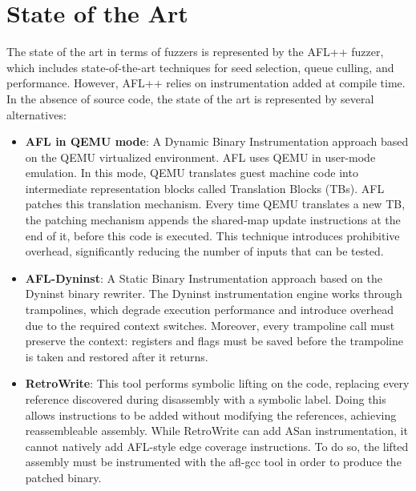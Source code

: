 \documentclass{report}
\begin{document}
            \section{State of the Art}
                The state of the art in terms of fuzzers is represented by the AFL++ fuzzer, which includes
                    state-of-the-art techniques for seed selection, queue culling, and performance.
                However, AFL++ relies on instrumentation added at compile time. In the absence of source code,
                    the state of the art is represented by several alternatives:
                \begin{itemize}
                    \item \textbf{AFL in QEMU mode}: A Dynamic Binary Instrumentation approach based on the QEMU virtualized environment.
                            AFL uses QEMU in user-mode emulation. In this mode, QEMU translates guest machine code into
                            intermediate representation blocks called Translation Blocks (TBs). AFL patches this translation mechanism.
                            Every time QEMU translates a new TB, the patching mechanism appends the shared-map update instructions
                            at the end of it, before this code is executed.
                            This technique introduces prohibitive overhead, significantly reducing the number of inputs that
                            can be tested. 
                    \item \textbf{AFL-Dyninst}: A Static Binary Instrumentation approach based on the Dyninst binary rewriter.
                            The Dyninst instrumentation engine works through trampolines, which degrade execution performance and introduce overhead
                            due to the required context switches.
                            Moreover, every trampoline call must preserve the context: registers and flags must be saved before the trampoline
                            is taken and restored after it returns.
                    \item \textbf{RetroWrite}: This tool performs symbolic lifting on the code, replacing every reference
                        discovered during disassembly with a symbolic label. Doing this allows instructions to be added without
                        modifying the references, achieving reassembleable assembly.
                        While RetroWrite can add ASan instrumentation, it cannot natively add AFL-style edge coverage instructions.
                        To do so, the lifted assembly must be instrumented with the afl-gcc tool in order to produce the patched binary.

\end{itemize}
\end{document}
